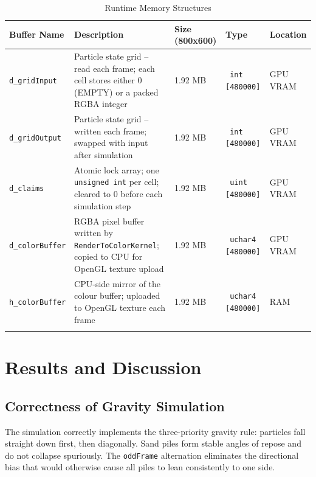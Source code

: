\documentclass[12pt,a4paper]{article}
\begin{document}
\begin{longtable}[htp]{|p{3cm}|p{5cm}|p{2cm}|p{2.5cm}|p{2.5cm}|}

\hline \textbf{Buffer Name} & \textbf{Description} & \textbf{Size (800x600)} & \textbf{Type} & \textbf{Location} \\

\hline \texttt{d\_gridInput} & Particle state grid -- read each frame; each cell stores either 0 (EMPTY) or a packed RGBA integer & 1.92 MB & \texttt{     int
[480000]} & GPU VRAM \\

\hline \texttt{d\_gridOutput} & Particle state grid -- written each frame; swapped with input after simulation & 1.92 MB & \texttt{     int
[480000]} & GPU VRAM \\

\hline \texttt{d\_claims} & Atomic lock array; one \texttt{unsigned int} per cell; cleared to 0 before each simulation step & 1.92 MB & \texttt{     uint
[480000]} & GPU VRAM \\

\hline \texttt{d\_colorBuffer} & RGBA pixel buffer written by \texttt{RenderToColorKernel}; copied to CPU for OpenGL texture upload & 1.92 MB & \texttt{     uchar4
[480000]} & GPU VRAM \\

\hline \texttt{h\_colorBuffer} & CPU-side mirror of the colour buffer; uploaded to OpenGL texture each frame & 1.92 MB & \texttt{     uchar4
[480000]} & RAM \\

\hline
\caption{Runtime Memory Structures}
\label{Table2}
\end{longtable}


	\newpage
	\section{Results and Discussion}

	\subsection{Correctness of Gravity Simulation}
    The simulation correctly implements the three-priority gravity rule: particles fall straight 
    down first, then diagonally. Sand piles form stable angles of repose and do not collapse 
    spuriously. The \texttt{oddFrame} alternation eliminates the directional bias that would 
    otherwise cause all piles to lean consistently to one side.
\end{document}
